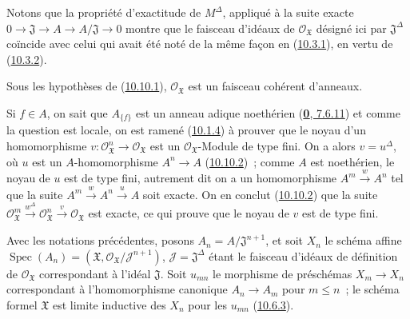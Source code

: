 Notons que la propriété d'exactitude de $M^\Delta$, appliqué à la suite
exacte
$0\to\mathfrak{J}\to A\to A/\mathfrak{J}\to0$ montre que le faisceau
d'idéaux de $\mathscr{O}_{\mathfrak{X}}$ désigné ici par
$\mathfrak{J}^\Delta$ coïncide avec celui qui avait été noté de la même
façon en (\hyperref[I.10.3.1-fr]{10.3.1}), en vertu de
(\hyperref[I.10.3.2-fr]{10.3.2}).

\begin{proposition}[10.10.3]
\label{I.10.10.3-fr}
Sous les hypothèses de \textup{(\hyperref[I.10.10.1-fr]{10.10.1})},
$\mathscr{O}_{\mathfrak{X}}$ est un faisceau cohérent d'anneaux.
\end{proposition}

Si $f\in A$, on sait que $A_{\{f\}}$ est un anneau adique noethérien
(\hyperref[0.7.6.11-fr]{\textbf{0}, 7.6.11}) et comme la question est locale, on
est ramené (\hyperref[I.10.1.4-fr]{10.1.4}) à prouver que le noyau d'un
homomorphisme
$v:\mathscr{O}_{\mathfrak{X}}^n\to\mathscr{O}_{\mathfrak{X}}$ est un
$\mathscr{O}_{\mathfrak{X}}$-Module de type fini. On a alors
$v=u^\Delta$, où $u$ est un $A$-homomorphisme $A^n\to A$
(\hyperref[I.10.10.2-fr]{10.10.2})~; comme $A$ est noethérien, le noyau
de $u$ est de type fini, autrement dit on a un homomorphisme
$A^m\xrightarrow{w}A^n$ tel que la suite
$A^m\xrightarrow{w}A^n\xrightarrow{u}A$ soit exacte. On en conclut
(\hyperref[I.10.10.2-fr]{10.10.2}) que la suite
$\mathscr{O}_{\mathfrak{X}}^m\xrightarrow{w^\Delta}
\mathscr{O}_{\mathfrak{X}}^n\xrightarrow{v}
\mathscr{O}_{\mathfrak{X}}$ est exacte, ce qui prouve que le noyau de
$v$ est de type fini.

\begin{env}[10.10.4]
\label{I.10.10.4-fr}
Avec les notations précédentes, posons
$A_n=A/\mathfrak{J}^{n+1}$, et soit $X_n$ le schéma affine
$\operatorname{Spec}(A_n)=(\mathfrak{X},
\mathscr{O}_{\mathfrak{X}}/\mathscr{J}^{n+1})$,
$\mathscr{J}=\mathfrak{J}^\Delta$ étant le faisceau d'idéaux de
définition de $\mathscr{O}_{\mathfrak{X}}$ correspondant à l'idéal
$\mathfrak{J}$. Soit $u_{mn}$ le morphisme de préschémas
$X_m\to X_n$ correspondant à l'homomorphisme canonique
$A_n\to A_m$ pour $m\leq n$~; le schéma formel $\mathfrak{X}$ est
limite inductive des $X_n$ pour les $u_{mn}$
(\hyperref[I.10.6.3-fr]{10.6.3}).
\end{env}

